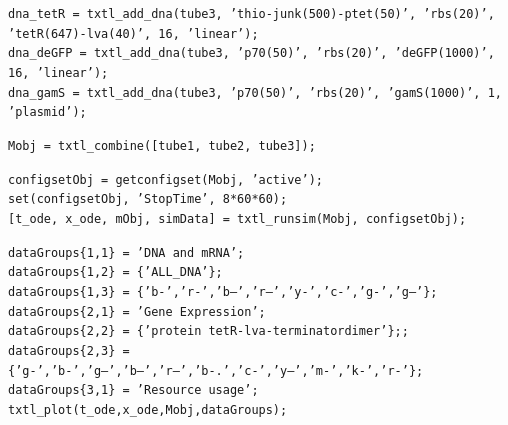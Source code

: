 \documentclass[english]{report}
\begin{document}
								\noindent \texttt{dna\_tetR = txtl\_add\_dna(tube3, 'thio-junk(500)-ptet(50)', 'rbs(20)', 'tetR(647)-lva(40)', 16, 'linear'); }\\
								\texttt{dna\_deGFP = txtl\_add\_dna(tube3, 'p70(50)', 'rbs(20)', 'deGFP(1000)', 16, 'linear');}\\
								\texttt{dna\_gamS = txtl\_add\_dna(tube3, 'p70(50)', 'rbs(20)', 'gamS(1000)', 1, 'plasmid');}
								\vspace*{1\baselineskip}
								
								\noindent \texttt{Mobj = txtl\_combine([tube1, tube2, tube3]);} 
								\vspace*{1\baselineskip}	
								
								\noindent \texttt{configsetObj = getconfigset(Mobj, 'active');}\\
								\texttt{set(configsetObj, 'StopTime', 8*60*60);}\\
								\texttt{[t\_ode, x\_ode, mObj, simData] = txtl\_runsim(Mobj, configsetObj);}
								\vspace*{1\baselineskip}
								
									 \begin{flushleft}
						 \texttt{\noindent dataGroups\{1,1\} = 'DNA and mRNA'; \\
						dataGroups\{1,2\} = \{'ALL\_DNA'\};\\ 
						dataGroups\{1,3\} = \{'b-','r-','b--','r--','y-','c-','g-','g--'\};\\}
						\vspace*{1\baselineskip}
						\texttt{\noindent dataGroups\{2,1\} = 'Gene Expression';\\
						dataGroups\{2,2\} = \{'protein tetR-lva-terminatordimer'\};;\\
						dataGroups\{2,3\} = \{'g-','b-','g--','b--','r--','b-.','c-','y--','m-','k-','r-'\};\\}
						\vspace*{1\baselineskip}
						\texttt{\noindent dataGroups\{3,1\} = 'Resource usage';\\}
						\vspace*{1\baselineskip}
						 \texttt{\noindent txtl\_plot(t\_ode,x\_ode,Mobj,dataGroups); \\} 
						 \end{flushleft}
		
\end{document}
